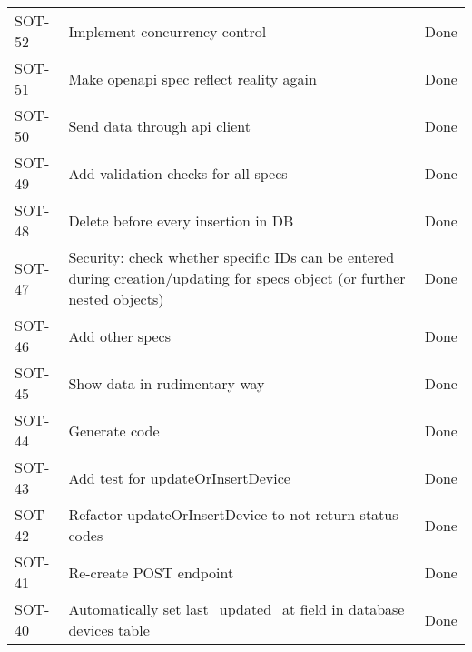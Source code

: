 \documentclass[dutch]{article}
\begin{document}
\begin{longtable}{@{}lp{6cm}l@{}}
    SOT-52             & Implement concurrency control                                                                                             & Done            \\
    SOT-51             & Make openapi spec reflect reality again                                                                                   & Done            \\
    SOT-50             & Send data through api client                                                                                              & Done            \\
    SOT-49             & Add validation checks for all specs                                                                                       & Done            \\
    SOT-48             & Delete before every insertion in DB                                                                                       & Done            \\
    SOT-47             & Security: check whether specific IDs can be entered during creation/updating for specs object (or further nested objects) & Done            \\
    SOT-46             & Add other specs                                                                                                           & Done            \\
    SOT-45             & Show data in rudimentary way                                                                                              & Done            \\
    SOT-44             & Generate code                                                                                                             & Done            \\
    SOT-43             & Add test for updateOrInsertDevice                                                                                         & Done            \\
    SOT-42             & Refactor updateOrInsertDevice to not return status codes                                                                  & Done            \\
    SOT-41             & Re-create POST endpoint                                                                                                   & Done            \\
    SOT-40             & Automatically set last\_updated\_at field in database devices table                                                       & Done            \\

\end{longtable}
\end{document}
